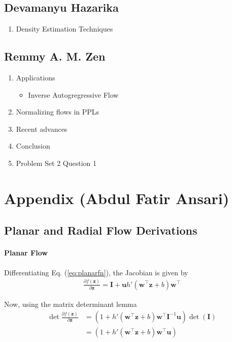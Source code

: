 \documentclass[runningheads]{llncs}
\begin{document}
\subsection*{Devamanyu Hazarika}
\begin{enumerate}
	\item Density Estimation Techniques
\end{enumerate}


\subsection*{Remmy A. M. Zen}
\begin{enumerate}
	\item Applications
	\begin{itemize}
		\item Inverse Autogregressive Flow
	\end{itemize}
	\item Normalizing flows in PPLs
	\item Recent advances
	\item Conclusion
	\item Problem Set 2 Question 1
\end{enumerate}

\section{Appendix (Abdul Fatir Ansari)}

\subsection{Planar and Radial Flow Derivations}

\paragraph{Planar Flow} Differentiating Eq. (\ref{eq:planarfn}), the Jacobian is given by
\begin{align*}
\frac{\partial f(\mathbf{z})}{\partial \mathbf{z}} = \mathbf{I} + \mathbf{u}h'(\mathbf{w}^\top\mathbf{z} + b)\mathbf{w}^\top
\end{align*}

Now, using the matrix determinant lemma
\begin{align}
\det\frac{\partial f(\mathbf{z})}{\partial \mathbf{z}} &= (1 + h'(\mathbf{w}^\top\mathbf{z} + b)\mathbf{w}^\top\mathbf{I}^{-1}\mathbf{u})\det(\mathbf{I})\\
&=(1 + h'(\mathbf{w}^\top\mathbf{z} + b)\mathbf{w}^\top\mathbf{u})\label{eq:planar-det}
\end{align}
\end{document}
